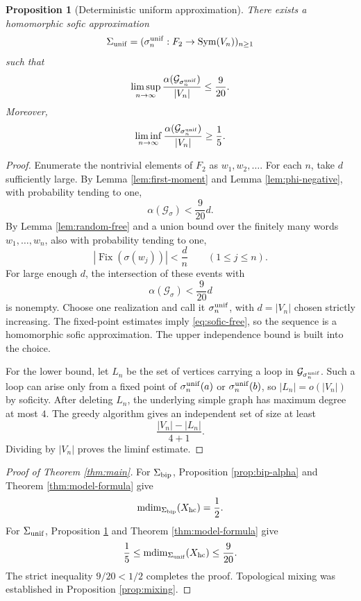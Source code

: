 \documentclass[12pt,a4paper]{amsart}
\newtheorem{proposition}[theorem]{Proposition}
\theoremstyle{definition}
\newcommand{\mdim}{\operatorname{mdim}}
\newcommand{\Sym}{\operatorname{Sym}}
\newcommand{\Fix}{\operatorname{Fix}}
\newcommand{\ind}{\alpha}
\newcommand{\cG}{\mathcal G}
\begin{document}
	\begin{proposition}[Deterministic uniform approximation]\label{prop:uniform-sequence}
		There exists a homomorphic sofic approximation
		\[
		\Sigma_{\rm unif}=(\sigma_n^{\rm unif}:F_2\to\Sym(V_n))_{n \geq 1}
		\]
		such that
		\[
		\limsup_{n\to\infty}
		\frac{\ind(\cG_{\sigma_n^{\rm unif}})}{|V_n|}
		\le\frac9{20}.
		\]
		Moreover,
		\[
		\liminf_{n\to\infty}
		\frac{\ind(\cG_{\sigma_n^{\rm unif}})}{|V_n|}
		\ge\frac15.
		\]
	\end{proposition}
	
	\begin{proof}
		Enumerate the nontrivial elements of $F_2$ as $w_1,w_2,\ldots$.  For each $n$, take $d$ sufficiently large.  By Lemma \ref{lem:first-moment} and Lemma \ref{lem:phi-negative}, with probability tending to one,
		\[
		\ind(\cG_\sigma)<\frac9{20}d.
		\]
		By Lemma \ref{lem:random-free} and a union bound over the finitely many words $w_1,\ldots,w_n$, also with probability tending to one,
		\[
		|\Fix(\sigma(w_j))|<\frac dn
		\qquad(1\le j\le n).
		\]
		For large enough $d$, the intersection of these events with
		\[
		\ind(\cG_\sigma)<\frac9{20}d
		\]
		is nonempty.  Choose one realization and call it $\sigma_n^{\rm unif}$, with $d=|V_n|$ chosen strictly increasing.  The fixed-point estimates imply \eqref{eq:sofic-free}, so the sequence is a homomorphic sofic approximation.  The upper independence bound is built into the choice.
		
		For the lower bound, let $L_n$ be the set of vertices carrying a loop in $\cG_{\sigma_n^{\rm unif}}$.  Such a loop can arise only from a fixed point of $\sigma_n^{\rm unif}(a)$ or $\sigma_n^{\rm unif}(b)$, so $|L_n|=o(|V_n|)$ by soficity.  After deleting $L_n$, the underlying simple graph has maximum degree at most $4$.  The greedy algorithm gives an independent set of size at least
		\[
		\frac{|V_n|-|L_n|}{4+1}.
		\]
		Dividing by $|V_n|$ proves the liminf estimate.
	\end{proof}
	
	\begin{proof}[Proof of Theorem \ref{thm:main}]
		For $\Sigma_{\rm bip}$, Proposition \ref{prop:bip-alpha} and Theorem \ref{thm:model-formula} give
		\[
		\mdim_{\Sigma_{\rm bip}}(X_{\rm hc})=\frac12.
		\]
		For $\Sigma_{\rm unif}$, Proposition \ref{prop:uniform-sequence} and Theorem \ref{thm:model-formula} give
		\[
		\frac15\le\mdim_{\Sigma_{\rm unif}}(X_{\rm hc})\le\frac9{20}.
		\]
		The strict inequality $9/20<1/2$ completes the proof.  Topological mixing was established in Proposition \ref{prop:mixing}.
	\end{proof}
	
\end{document}
